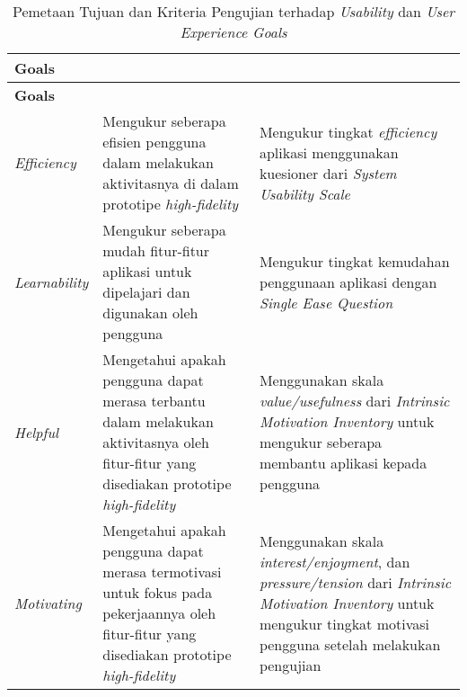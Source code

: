 \RaggedLeft
\begin{small}
\begin{longtable}[c]{|W{c}{0.16\textwidth}|>{\ccnormspacing}m{0.36\textwidth}|>{\ccnormspacing}m{0.36\textwidth}|}
  \caption{Pemetaan Tujuan dan Kriteria Pengujian terhadap \textit{Usability} dan \textit{User Experience Goals}}
  \label{tab:daftar_pengujian_goals} \\
  \hline {}
  \textbf{Goals} &  &  \\ \hline \endfirsthead
  \hline {}
  \textbf{Goals} &  & \\ \hline \endhead
  \hline \endfoot

  \textit{Efficiency} & Mengukur seberapa efisien pengguna dalam melakukan aktivitasnya di dalam prototipe \textit{high-fidelity} & Mengukur tingkat \textit{efficiency} aplikasi menggunakan kuesioner dari \textit{System Usability Scale} \\ \hline
  
  \textit{Learnability} & Mengukur seberapa mudah fitur-fitur aplikasi untuk dipelajari dan digunakan oleh pengguna & Mengukur tingkat kemudahan penggunaan aplikasi dengan \textit{Single Ease Question}\\ \hline
  
  \textit{Helpful} & Mengetahui apakah pengguna dapat merasa terbantu dalam melakukan aktivitasnya oleh fitur-fitur yang disediakan prototipe \textit{high-fidelity}  & Menggunakan skala \textit{value/usefulness} dari \textit{Intrinsic Motivation Inventory} untuk mengukur seberapa membantu aplikasi kepada pengguna \\ \hline
  
  \textit{Motivating} & Mengetahui apakah pengguna dapat merasa termotivasi untuk fokus pada pekerjaannya oleh fitur-fitur yang disediakan prototipe \textit{high-fidelity} & Menggunakan skala \textit{interest/enjoyment}, dan \textit{pressure/tension} dari \textit{Intrinsic Motivation Inventory} untuk mengukur tingkat motivasi pengguna setelah melakukan pengujian \\ \hline

\end{longtable}
\end{small}
\justifying
\FloatBarrier

